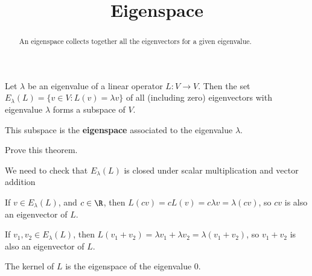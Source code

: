 \documentclass{ximera}
\title{Eigenspace}
\begin{document}
\begin{abstract}
  An eigenspace collects together all the eigenvectors for a given eigenvalue.
\end{abstract}\maketitle

\begin{theorem}
  Let $\lambda$ be an eigenvalue of a linear operator $L:V\to V$.
  Then the set $E_\lambda(L) = \{ v \in V: L(v) = \lambda v\}$ of all
  (including zero) eigenvectors with eigenvalue $\lambda$ forms a
  subspace of $V$.

  This subspace is the \textbf{eigenspace} associated to the
  eigenvalue $\lambda$.
\end{theorem}

Prove this theorem.
\begin{free-response}
	We need to check that $E_\lambda(L)$ is closed under scalar multiplication and vector addition
	
	If $v \in E_\lambda(L)$, and $c \in \R$, then $L(cv) = cL(v) = c\lambda v = \lambda( cv)$, so $cv$ is also an eigenvector of $L$.
	
	If $v_1,v_2 \in E_\lambda(L)$, then $L(v_1+v_2) = \lambda v_1+\lambda v_2 = \lambda( v_1 + v_2)$, so $v_1+v_2$ is also an eigenvector of $L$.
\end{free-response}

The kernel of $L$ is the eigenspace of the eigenvalue $0$.
\end{document}

